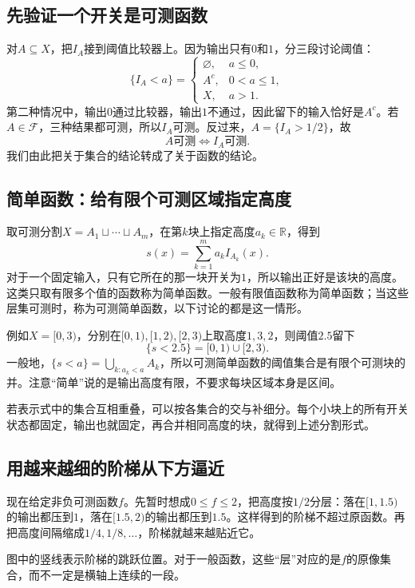 \subsection{先验证一个开关是可测函数}

对$A\subseteq X$，把$I_A$接到阈值比较器上。因为输出只有$0$和$1$，分三段讨论阈值：
\[
 \{I_A<a\}=
 \begin{cases}
 \varnothing,&a\leq0,\\
 A^c,&0<a\leq1,\\
 X,&a>1.
 \end{cases}
\]
第二种情况中，输出$0$通过比较器，输出$1$不通过，因此留下的输入恰好是$A^c$。若$A\in\mathcal F$，三种结果都可测，所以$I_A$可测。反过来，$A=\{I_A>1/2\}$，故
\[
 \boxed{A\text{可测}\iff I_A\text{可测}.}
\]
我们由此把关于集合的结论转成了关于函数的结论。

\subsection{简单函数：给有限个可测区域指定高度}

取可测分割$X=A_1\sqcup\cdots\sqcup A_m$，在第$k$块上指定高度$a_k\in\mathbb R$，得到
\[
 s(x)=\sum_{k=1}^{m}a_kI_{A_k}(x).
\]
对于一个固定输入，只有它所在的那一块开关为$1$，所以输出正好是该块的高度。这类只取有限多个值的函数称为简单函数。一般有限值函数称为简单函数；当这些层集可测时，称为可测简单函数，以下讨论的都是这一情形。

例如$X=[0,3)$，分别在$[0,1),[1,2),[2,3)$上取高度$1,3,2$，则阈值$2.5$留下
\[
 \{s<2.5\}=[0,1)\cup[2,3).
\]
一般地，$\{s<a\}=\bigcup_{k:a_k<a}A_k$，所以可测简单函数的阈值集合是有限个可测块的并。注意“简单”说的是输出高度有限，不要求每块区域本身是区间。

若表示式中的集合互相重叠，可以按各集合的交与补细分。每个小块上的所有开关状态都固定，输出也就固定，再合并相同高度的块，就得到上述分割形式。

\subsection{用越来越细的阶梯从下方逼近}

现在给定非负可测函数$f$。先暂时想成$0\leq f\leq2$，把高度按$1/2$分层：落在$[1,1.5)$的输出都压到$1$，落在$[1.5,2)$的输出都压到$1.5$。这样得到的阶梯不超过原函数。再把高度间隔缩成$1/4,1/8,\ldots$，阶梯就越来越贴近它。

\begin{center}
\end{center}
图中的竖线表示阶梯的跳跃位置。对于一般函数，这些“层”对应的是$f$的原像集合，而不一定是横轴上连续的一段。

